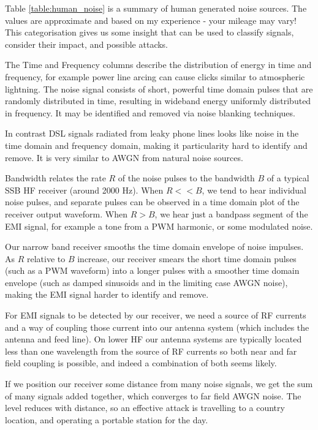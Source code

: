 \documentclass{article}
\begin{document}
Table \ref{table:human_noise} is a summary of human generated noise sources.  The values are approximate and based on my experience - your mileage may vary!  This categorisation gives us some insight that can be used to classify signals, consider their impact, and possible attacks.

The Time and Frequency columns describe the distribution of energy in time and frequency, for example power line arcing can cause clicks similar to atmospheric lightning.  The noise signal consists of short, powerful time domain pulses that are randomly distributed in time, resulting in wideband energy uniformly distributed in frequency. It may be identified and removed via noise blanking techniques.

In contrast DSL signals radiated from leaky phone lines looks like noise in the time domain and frequency domain, making it particularity hard to identify and remove.  It is very similar to AWGN from natural noise sources.

Bandwidth relates the rate $R$ of the noise pulses to the bandwidth $B$ of a typical SSB HF receiver (around 2000 Hz).  When $R<<B$, we tend to hear individual noise pulses, and separate pulses can be observed in a time domain plot of the receiver output waveform.  When $R>B$, we hear just a bandpass segment of the EMI signal, for example a tone from a PWM harmonic, or some modulated noise.

Our narrow band receiver smooths the time domain envelope of noise impulses. As $R$ relative to $B$ increase, our receiver smears the short time domain pulses (such as a PWM waveform) into a longer pulses with a smoother time domain envelope (such as damped sinusoids and in the limiting case AWGN noise), making the EMI signal harder to identify and remove.

For EMI signals to be detected by our receiver, we need a source of RF currents and a way of coupling those current into our antenna system (which includes the antenna and feed line).  On lower HF our antenna systems are typically located less than one wavelength from the source of RF currents so both near and far field coupling is possible, and indeed a combination of both seems likely.

If we position our receiver some distance from many noise signals, we get the sum of many signals added together, which converges to far field AWGN noise.  The level reduces with distance, so an effective attack is travelling to a country location, and operating a portable station for the day.
\end{document}
